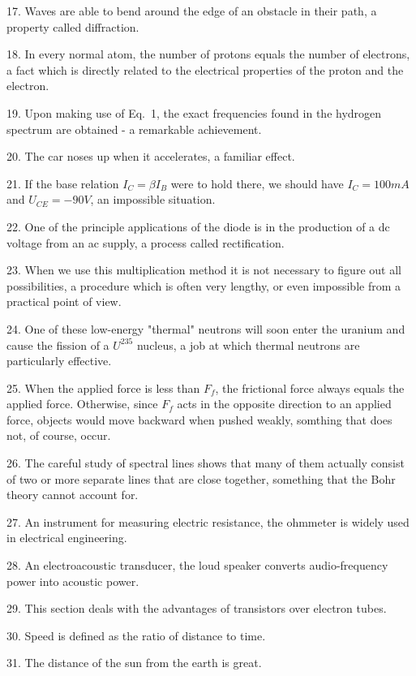 \documentclass[a4paper,twocolumn,10pt]{article}
\begin{document}
\begin{CJK}{UTF8}{gkai}
	17. Waves are able to bend around the edge of an obstacle in their path, a property
	called diffraction.

	18. In every normal atom, the number of protons equals the number of electrons,
	a fact which is directly related to the electrical properties of the proton and the electron.

	19. Upon making use of Eq.~1, the exact frequencies found in the hydrogen spectrum are
	obtained - a remarkable achievement.

	20. The car noses up when it accelerates, a familiar effect.

	21. If the base relation $I_C = \beta I_B$ were to hold there, we should have $I_C = 100 mA$
	and $U_{CE} = -90V$, an impossible situation.

	22. One of the principle applications of the diode is in the production of a dc voltage
	from an ac supply, a process called rectification.

	23. When we use this multiplication method it is not necessary to figure out
	all possibilities, a procedure which is often very lengthy, or even impossible
	from a practical point of view.

	24. One of these low-energy "thermal" neutrons will soon enter the uranium and
	cause the fission of a $U^{235}$ nucleus, a job at which thermal neutrons are particularly effective.

	25. When the applied force is less than $F_f$, the frictional force always equals the applied
	force. Otherwise, since $F_f$ acts in the opposite direction to an applied force, objects would
	move backward when pushed weakly, somthing that does not, of course, occur.

	26. The careful study of spectral lines shows that many of them actually consist of two or
	more separate lines that are close together, something that the Bohr theory cannot account for.

	27. An instrument for measuring electric resistance, the ohmmeter is widely used in electrical engineering.

	28. An electroacoustic transducer, the loud speaker converts audio-frequency power into acoustic power.

	29. This section deals with the advantages of transistors over electron tubes.

	30. Speed is defined as the ratio of distance to time.

	31. The distance of the sun from the earth is great.


\end{CJK}
\end{document}
